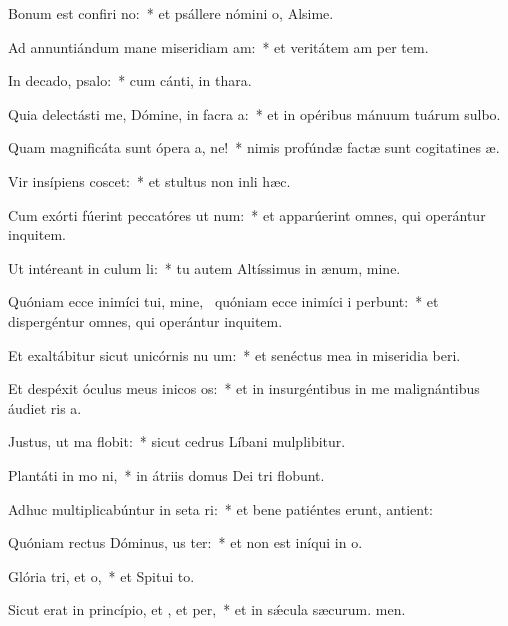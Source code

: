 \item Bonum est confiri no:~* et psállere nómini o, Alsime.
\item Ad annuntiándum mane miseridiam am:~* et veritátem am per tem.
\item In decado, psalo:~* cum cánti, in thara.
\item Quia delectásti me, Dómine, in facra a:~* et in opéribus mánuum tuárum sulbo.
\item Quam magnificáta sunt ópera a, ne!~* nimis profúndæ factæ sunt cogitatines æ.
\item Vir insípiens  coscet:~* et stultus non inli hæc.
\item Cum exórti fúerint peccatóres ut num:~* et apparúerint omnes, qui operántur inquitem.
\item Ut intéreant in culum li:~* tu autem Altíssimus in ænum, mine.
\item Quóniam ecce inimíci tui, mine,~\pscross{} quóniam ecce inimíci i perbunt:~* et dispergéntur omnes, qui operántur inquitem.
\item Et exaltábitur sicut unicórnis nu um:~* et senéctus mea in miseridia beri.
\item Et despéxit óculus meus inicos os:~* et in insurgéntibus in me malignántibus áudiet ris a.
\item Justus, ut ma flobit:~* sicut cedrus Líbani mulplibitur.
\item Plantáti in mo ni,~* in átriis domus Dei tri flobunt.
\item Adhuc multiplicabúntur in seta ri:~* et bene patiéntes erunt,  antient:
\item Quóniam rectus Dóminus, us ter:~* et non est iníqui in o.
\item Glória tri, et o,~* et Spitui to.
\item Sicut erat in princípio, et , et per,~* et in sǽcula sæcurum. men.
